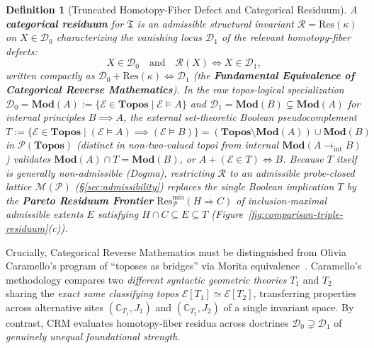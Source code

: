 \documentclass[10pt,twoside,openright]{book}
\theoremstyle{crmplain}
\theoremstyle{crmdef}
\newtheorem{definition}[theorem]{Definition}
\theoremstyle{crmremark}
\begin{document}
\begin{definition}[Truncated Homotopy-Fiber Defect and Categorical Residuum]
A \textbf{categorical residuum} for $\mathfrak{T}$ is an admissible structural invariant $\mathcal{R} = \mathrm{Res}(\kappa)$ on $X \in \mathcal{D}_0$ characterizing the vanishing locus $\mathcal{D}_1$ of the relevant homotopy-fiber defects:
\[
  X \in \mathcal{D}_0 \quad \text{and} \quad \mathcal{R}(X) \iff X \in \mathcal{D}_1,
\]
written compactly as $\mathcal{D}_0 + \mathrm{Res}(\kappa) \iff \mathcal{D}_1$ (the \textbf{Fundamental Equivalence of Categorical Reverse Mathematics}). In the raw topos-logical specialization $\mathcal{D}_0 = \mathbf{Mod}(A) := \{\mathcal{E} \in \mathbf{Topos} \mid \mathcal{E} \models A\}$ and $\mathcal{D}_1 = \mathbf{Mod}(B) \subsetneq \mathbf{Mod}(A)$ for internal principles $B \implies A$, the external set-theoretic Boolean pseudocomplement $T := \{\mathcal{E} \in \mathbf{Topos} \mid (\mathcal{E} \models A) \implies (\mathcal{E} \models B)\} = (\mathbf{Topos} \setminus \mathbf{Mod}(A)) \cup \mathbf{Mod}(B)$ in $\mathcal{P}(\mathbf{Topos})$ (distinct in non-two-valued topoi from internal $\mathbf{Mod}(A \to_{\mathrm{int}} B)$) validates $\mathbf{Mod}(A) \cap T = \mathbf{Mod}(B)$, or $A + (\mathcal{E} \in T) \iff B$. Because $T$ itself is generally non-admissible (\emph{Dogma}), restricting $\mathcal{R}$ to an admissible probe-closed lattice $\mathcal{M}(\mathcal{P})$ (§\ref{sec:admissibility}) replaces the single Boolean implication $T$ by the \textbf{Pareto Residuum Frontier} $\mathrm{Res}_{\mathcal{P}}^{\min}(H \Rightarrow C)$ of inclusion-maximal admissible extents $E$ satisfying $H \cap C \subseteq E \subseteq T$ (Figure~\ref{fig:comparison-triple-residuum}(c)).
\end{definition}

Crucially, Categorical Reverse Mathematics must be distinguished from Olivia Caramello's program of ``toposes as bridges'' via Morita equivalence~\cite{Caramello18}. Caramello's methodology compares two \emph{different syntactic geometric theories} $T_1$ and $T_2$ sharing the \emph{exact same classifying topos} $\mathcal{E}[T_1] \simeq \mathcal{E}[T_2]$, transferring properties across alternative sites $(\mathbb{C}_{T_1}, J_1)$ and $(\mathbb{C}_{T_2}, J_2)$ of a single invariant space. By contrast, $\mathrm{CRM}$ evaluates homotopy-fiber residua across doctrines $\mathcal{D}_0 \supsetneq \mathcal{D}_1$ of \emph{genuinely unequal foundational strength}.
\end{document}
